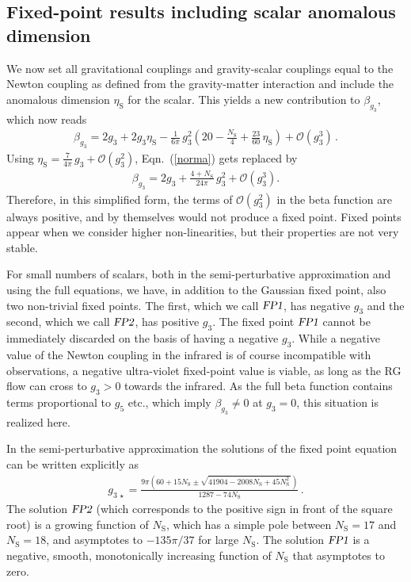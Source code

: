 \documentclass[11pt]{book} %
\newcommand\etaS{ \eta_{\scriptscriptstyle{\mathrm{S}}} }
\newcommand\NS{ N_{\scriptscriptstyle{\mathrm{S}}} }
\newcommand{\FPone}  {\textsl{FP1}}
\newcommand{\FPtwo}  {\textsl{FP2}}
\numberwithin{equation}{chapter}
\begin{document}
\subsection{Fixed-point results including scalar anomalous dimension}
\label{FPwithmatterincludingetas}

We now set all gravitational couplings and gravity-scalar couplings equal to the Newton
coupling as defined from the gravity-matter interaction and include the anomalous dimension $\etaS$ for the scalar.
This yields a new contribution to $\beta_{g_3}$, which now reads
\begin{align}
  \beta_{g_3} = 2 g_3 + 2 g_3 \etaS - \frac{1}{6\pi} \, g_3^2
  \left( 20 - \frac{\NS}{4} + \frac{23}{60} \, \etaS \right)
  + \mathcal{O}(g_3^3) \,.
\end{align}
Using $\etaS = \frac{7}{4\pi} \, g_3 + \mathcal{O}(g_3^2)$, Eqn.~(\ref{norma}) gets replaced by
\begin{align}
  \beta_{g_3} = 2 g_3 +\frac{4+\NS}{24\pi} \, g_3^2 + \mathcal{O}(g_3^3).
\end{align}
Therefore, in this simplified form,
the terms of $\mathcal O(g_3^2)$ in the beta function
are always positive, and by themselves would
not produce a fixed point.
Fixed points appear when we consider higher non-linearities,
but their properties are not very stable.

For small numbers of scalars, both in the semi-perturbative
approximation and using the full equations, we have,
in addition to the Gaussian fixed point,
also two non-trivial fixed points.
The first, which we call $\FPone$, has
negative $g_3$ and the second, which we call $\FPtwo$,
has positive $g_3$.
The fixed point $\FPone$ cannot be immediately
discarded on the basis of having a negative $g_3$.
While a negative value of the Newton coupling in the infrared is of course incompatible with observations,
a negative ultra-violet fixed-point value is viable,
as long as the RG flow can cross to $g_3>0$ towards the infrared.
As the full beta function contains terms proportional to $g_5$ etc.,
which imply $\beta_{g_3}\neq0$ at $g_3=0$, this situation is realized here.

In the semi-perturbative approximation the solutions
of the fixed point equation can be written explicitly as
\begin{align}
  g_{3\,\star} = \frac{9 \pi \left( 60 + 15 \NS \pm \sqrt{41904-2008\NS+45\NS^2\,} \right)}{1287-74\NS} \,.
\end{align}
The solution $\FPtwo$ (which corresponds to the positive sign
in front of the square root) is a growing function of $\NS$, which has a simple pole
between $\NS=17$ and $\NS=18$, and asymptotes to $-135\pi/37$ for large $\NS$.
The solution $\FPone$ is a negative, smooth, monotonically increasing function
of $\NS$ that asymptotes to zero.
\end{document}
